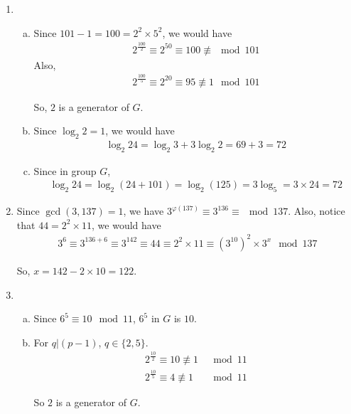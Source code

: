 \documentclass[a4paper,12pt]{journal}
\begin{document}
\begin{enumerate}
			\item \begin{enumerate}[a)]
				\item Since $101 - 1 = 100 = 2^{2} \times 5^{2}$, we would have
				\begin{align*}
					2^{\frac{100}{2}} \equiv 2^{50} \equiv 100 \not\equiv \mod 101
				\end{align*}
				Also,
				\begin{align*}
					2^{\frac{100}{5}} \equiv 2^{20} \equiv 95 \not\equiv 1 \mod 101
				\end{align*}
				\par So, $2$ is a generator of $G$.
				
				\item Since $\log_{2}2 = 1$, we would have
				\begin{align*}
					\log_{2}24 = \log_{2}3 + 3\log_{2}2 = 69 + 3 = 72
				\end{align*}
				
				\item Since in group $G$,
				\begin{align*}
					\log_{2}24 = \log_{2}(24 + 101) = \log_{2}(125) = 3\log_{5} = 3 \times 24 = 72
				\end{align*}
			\end{enumerate}
			
			\item Since $\gcd(3, 137) = 1$, we have $3^{\varphi(137)} \equiv 3^{136} \equiv \mod 137$. Also, notice that $44 = 2^{2} \times 11$, we would have
			\begin{align*}
				3^{6} \equiv 3^{136 + 6} \equiv 3^{142} \equiv 44 \equiv 2^{2} \times 11 \equiv (3^{10})^{2} \times 3^{x} \mod 137
			\end{align*}
			\par So, $x = 142 - 2 \times 10 = 122$.
			
			\item \begin{enumerate}[a)]
				\item Since $6^{5} \equiv 10 \mod 11$, $6^{5}$ in $G$ is $10$.
				
				\item For $q \vert (p-1)$, $q \in \{2, 5\}$.
				\begin{align*}
					2^{\frac{10}{2}} \equiv 10 \not\equiv 1 &\mod 11 \\
					2^{\frac{10}{5}} \equiv 4 \not\equiv 1 &\mod 11
				\end{align*}
				\par So $2$ is a generator of $G$.
				

\end{enumerate}
\end{enumerate}
\end{document}
